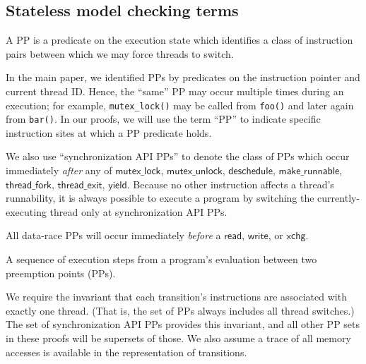 \subsection{Stateless model checking terms}

\begin{definition}
	A PP is a predicate on the execution state which identifies a class of instruction pairs between which we may force threads to switch.
\end{definition}

In the main paper, we identified PPs by predicates on the instruction pointer and current thread ID. Hence, the ``same'' PP may occur multiple times during an execution; for example, {\tt mutex\_lock()} may be called from {\tt foo()} and later again from {\tt bar()}.
In our proofs, we will use the term ``PP'' to indicate specific instruction sites at which a PP predicate holds.

We also use ``synchronization API PPs'' to denote the class of
PPs which occur immediately {\em after} any of
$\mathsf{mutex\_lock}$,
$\mathsf{mutex\_unlock}$,
$\mathsf{deschedule}$,
$\mathsf{make\_runnable}$,
$\mathsf{thread\_fork}$,
$\mathsf{thread\_exit}$,
$\mathsf{yield}$.
Because no other instruction affects a thread's runnability, it is always possible to execute a program by switching the currently-executing thread only at synchronization API PPs.

All data-race PPs will occur immediately {\em before} a $\mathsf{read}$, $\mathsf{write}$, or $\mathsf{xchg}$.

\begin{definition}[Transition]
A sequence of execution steps from a program's evaluation between two preemption points (PPs).
\label{def:transition}

\end{definition}
We require the invariant that each transition's instructions are associated with exactly one thread. (That is, the set of PPs always includes all thread switches.)
The set of synchronization API PPs provides this invariant, and all other PP sets in these proofs will be supersets of those.
We also assume a trace of all memory accesses is available in the representation of transitions.

